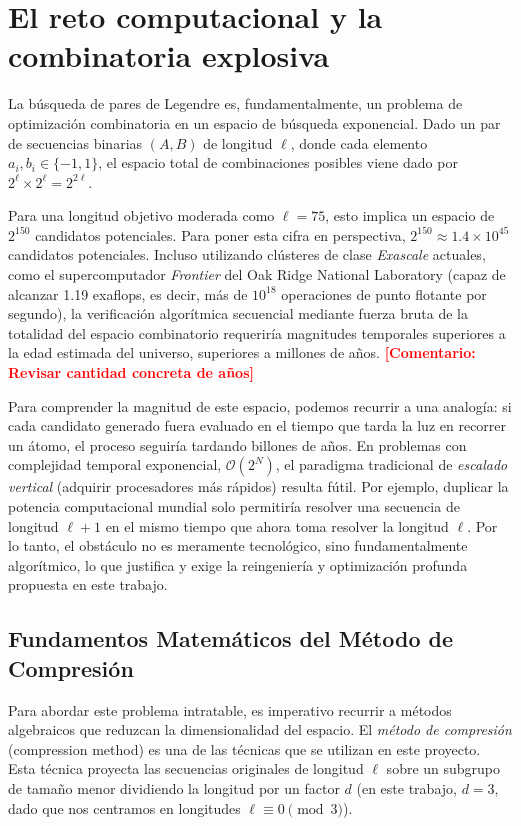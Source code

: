 \documentclass[12pt,a4paper]{tfg_domingo}
\newcommand{\Comentario}[1]{\textcolor{red}{\textbf{[Comentario:
      #1]}}}
\begin{document}
\section{El reto computacional y la combinatoria explosiva}

La búsqueda de pares de Legendre es, fundamentalmente, un problema de
optimización combinatoria en un espacio de búsqueda exponencial. Dado
un par de secuencias binarias $(A, B)$ de longitud $\ell$, donde cada
elemento $a_i, b_i \in \{-1, 1\}$, el espacio total de combinaciones
posibles viene dado por $2^\ell \times 2^\ell = 2^{2\ell}$. 

Para una longitud objetivo moderada como $\ell=75$, esto implica un
espacio de $2^{150}$ candidatos potenciales. Para poner esta cifra en perspectiva, $2^{150} \approx 1.4 \times 10^{45}$ candidatos potenciales. Incluso utilizando clústeres de clase \emph{Exascale} actuales, como el supercomputador \emph{Frontier} del Oak Ridge National Laboratory (capaz de alcanzar 1.19 exaflops, es decir, más de $10^{18}$ operaciones de punto flotante por segundo), la verificación algorítmica secuencial mediante fuerza bruta de la totalidad del espacio combinatorio requeriría magnitudes temporales superiores a la edad estimada del universo, superiores a millones de años. %
\Comentario{Revisar cantidad concreta de años}

Para comprender la magnitud de este espacio, podemos recurrir a una
analogía: si cada candidato generado fuera evaluado en el tiempo que
tarda la luz en recorrer un átomo, el proceso seguiría tardando
billones de años. En problemas con complejidad temporal exponencial,
$\mathcal{O}(2^N)$, el paradigma tradicional de \textit{escalado vertical}
(adquirir procesadores más rápidos) resulta fútil. Por ejemplo,
duplicar la potencia computacional mundial solo permitiría resolver
una secuencia de longitud $\ell + 1$ en el mismo tiempo que ahora toma
resolver la longitud $\ell$. Por lo tanto, el obstáculo no es meramente
tecnológico, sino fundamentalmente algorítmico, lo que justifica y
exige la reingeniería y optimización profunda propuesta en este
trabajo.



\subsection{Fundamentos Matemáticos del Método de Compresión}

Para abordar este problema intratable, es imperativo recurrir a
métodos algebraicos que reduzcan la dimensionalidad del espacio. El
\emph{método de compresión} (compression method) es una de las
técnicas que se utilizan en este proyecto. Esta técnica proyecta las secuencias originales de
longitud $\ell$ sobre un subgrupo de tamaño menor dividiendo la longitud
por un factor $d$ (en este trabajo, $d=3$, dado que nos centramos en
longitudes $\ell \equiv 0 \pmod 3$). 
\end{document}
